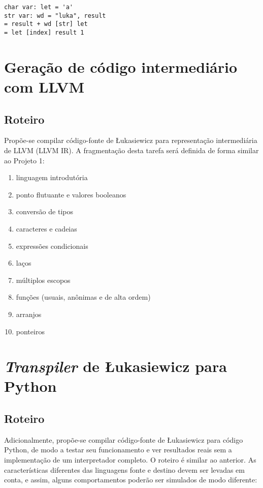 \documentclass{sftex/sftex}
\newenvironment{smallenum}{
    \vspace{-1mm}
    \begin{enumerate}[label=\roman*.]
    \setlength{\parskip}{0pt}
    \setlength{\itemsep}{2pt}
}{
    \vspace{-2mm}
    \end{enumerate}
}
\begin{document}
\begin{verbatim}
char var: let = 'a'
str var: wd = "luka", result
= result + wd [str] let
= let [index] result 1
\end{verbatim}

\section{Geração de código intermediário com LLVM}

\subsection{Roteiro}
Propõe-se compilar código-fonte de Łukasiewicz para representação intermediária
de LLVM (LLVM IR). A fragmentação desta tarefa será definida de forma similar
ao Projeto 1:

\begin{smallenum}
    \item linguagem introdutória
    \item ponto flutuante e valores booleanos
    \item conversão de tipos
    \item caracteres e cadeias
    \item expressões condicionais
    \item laços
    \item múltiplos escopos
    \item funções (usuais, anônimas e de alta ordem)
    \item arranjos
    \item ponteiros
\end{smallenum}

\section{\emph{Transpiler} de Łukasiewicz para Python}

\subsection{Roteiro}

Adicionalmente, propõe-se compilar código-fonte de Łukasiewicz para código
Python, de modo a testar seu funcionamento e ver resultados reais sem a
implementação de um interpretador completo. O roteiro é similar ao anterior. As
características diferentes das linguagens fonte e destino devem ser levadas em
conta, e assim, alguns comportamentos poderão ser simulados de modo diferente:
\end{document}

